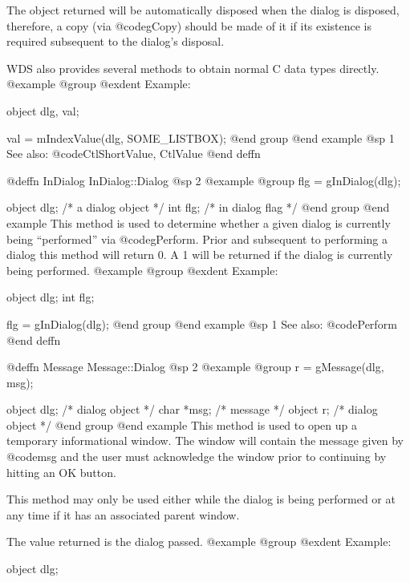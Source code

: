 The object returned will be automatically disposed when the dialog is
disposed, therefore, a copy (via @code{gCopy}) should be made of it if
its existence is required subsequent to the dialog's disposal.

WDS also provides several methods to obtain normal C data types directly.
@example
@group
@exdent Example:

object  dlg, val;

val = mIndexValue(dlg, SOME_LISTBOX);
@end group
@end example
@sp 1
See also:  @code{CtlShortValue, CtlValue}
@end deffn








@deffn {InDialog} InDialog::Dialog
@sp 2
@example
@group
flg = gInDialog(dlg);

object  dlg;    /*  a dialog object  */
int     flg;    /*  in dialog flag   */
@end group
@end example
This method is used to determine whether a given dialog is currently
being ``performed'' via @code{gPerform}.  Prior and subsequent to
performing a dialog this method will return 0.  A 1 will be returned
if the dialog is currently being performed.
@example
@group
@exdent Example:

object  dlg;
int     flg;

flg = gInDialog(dlg);
@end group
@end example
@sp 1
See also:  @code{Perform}
@end deffn















@deffn {Message} Message::Dialog
@sp 2
@example
@group
r = gMessage(dlg, msg);

object  dlg;    /*  dialog object  */
char    *msg;   /*  message        */
object  r;      /*  dialog object  */
@end group
@end example
This method is used to open up a temporary informational window.  The
window will contain the message given by @code{msg} and the user must
acknowledge the window prior to continuing by hitting an OK button.

This method may only be used either while the dialog is being performed
or at any time if it has an associated parent window.

The value returned is the dialog passed.
@example
@group
@exdent Example:

object  dlg;

